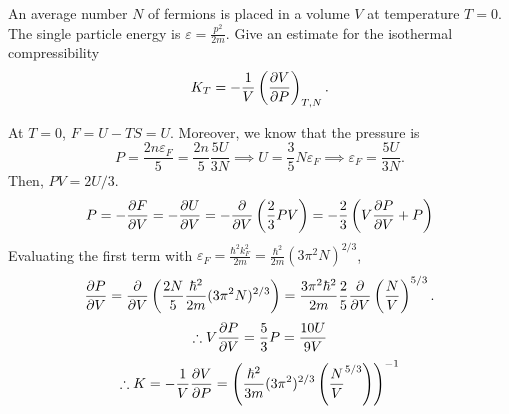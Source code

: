         \begin{eocproblem*}{}
            An average number $N$ of fermions is placed in a volume $V$ at temperature $T=0$. The single particle energy is $\varepsilon=\frac{p^2}{2m}$. Give an estimate for the isothermal compressibility
            \begin{equation}
                K_T = -\frac{1}{V}\left( \frac{\partial V}{\partial P} \right)_{T,N}.
            \end{equation}

        \end{eocproblem*}
            At $T=0$, $F=U-TS=U$. Moreover, we know that the pressure is
            \begin{equation}
                P=\frac{2n\varepsilon_F}{5}=\frac{2n}{5}\frac{5U}{3N} \implies U = \frac{3}{5}N\varepsilon_F\implies \varepsilon_F = \frac{5U}{3N}.
            \end{equation}
            Then, $PV = 2U/3$. 
            \begin{equation}
                P = -\frac{\partial F}{\partial V} = -\frac{\partial U}{\partial V} = -\frac{\partial }{\partial V}\left( \frac{2}{3}PV \right)=-\frac{2}{3}\left( V \frac{\partial P}{\partial V}+P \right)
            \end{equation}
            Evaluating the first term with $\varepsilon_F = \frac{\hbar^2k_F^2}{2m}=\frac{\hbar^2}{2m}(3\pi^2N)^{2/3}$,
            \begin{equation}
                \frac{\partial P}{\partial V} = \frac{\partial }{\partial V}\left( \frac{2N}{5}\frac{\hbar^2}{2m}(3\pi^2N)^{2/3} \right) = \frac{3\pi^2\hbar^2}{2m}\frac{2}{5} \frac{\partial }{\partial V}\left( \frac{N}{V} \right)^{5/3}.
            \end{equation}
            \begin{equation}
                \therefore V \frac{\partial P}{\partial V}=\frac{5}{3}P = \frac{10U}{9V}
            \end{equation}
            \begin{equation}
                \therefore K = -\frac{1}{V} \frac{\partial V}{\partial P}=\left( \frac{\hbar^2}{3m}(3\pi^2)^{2/3}\left( \frac{N}{V}^{5/3} \right) \right)^{-1}
            \end{equation}